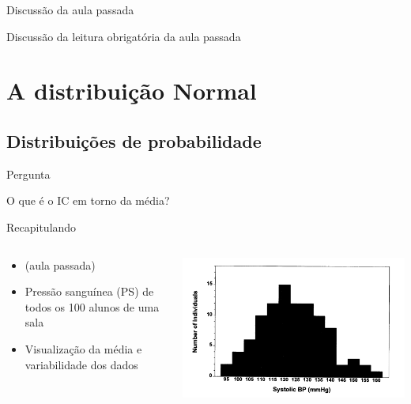 \documentclass{beamer}
\begin{document}

\begin{frame}{\scriptsize Discussão da aula passada}
  \begin{block}{}
    Discussão da leitura obrigatória da aula passada
  \end{block}
\end{frame}

\section{A distribuição Normal}

\subsection{Distribuições de probabilidade}

\begin{frame}[label=oquee]{\scriptsize Pergunta}
  \begin{block}{}
    \Large\centering
    O que é o IC em torno da média?
  \end{block}
\end{frame}

\begin{frame}{\scriptsize Recapitulando}
  \begin{columns}
    \begin{column}{5cm}
      \begin{itemize}
        \scriptsize
      \item ({\tiny aula passada})
        \bigskip
      \item Pressão sanguínea (PS) de todos os 100 alunos de uma sala
        \medskip
      \item Visualização da média e variabilidade dos dados
      \end{itemize}
    \end{column}
    \begin{column}{5cm}
      \includegraphics[width=\textwidth]{Cap3/histograma1}
    \end{column}
  \end{columns}
\end{frame}
\end{document}
